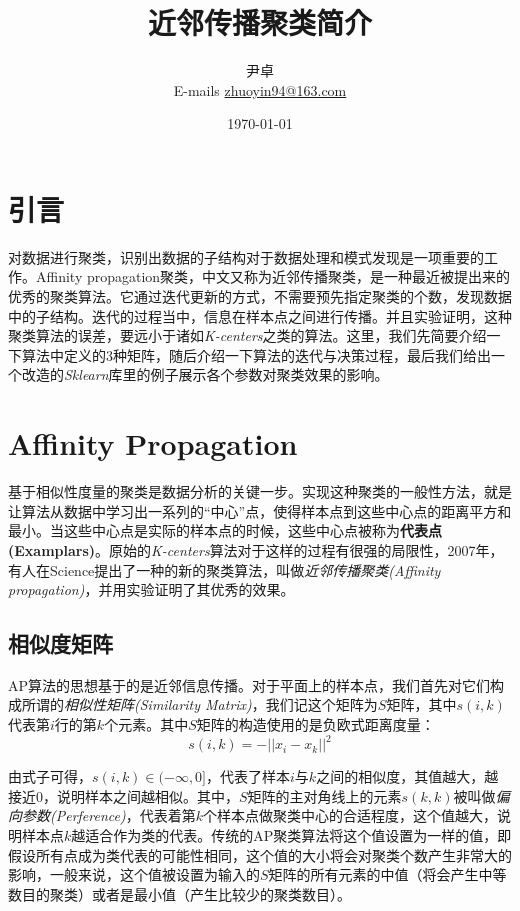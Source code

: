 \documentclass[UTF8, 12pt]{ctexart}
\begin{document}
	
	\title{\heiti \Huge{近邻传播聚类简介}}
	\author{\kaishu 尹卓 \\ E-mails \href{mailto:zhuoyin94@163.com}{zhuoyin94@163.com}}
	\date{\today}
	\maketitle
	
	\tableofcontents
	\newpage
	\section{引言}
	对数据进行聚类，识别出数据的子结构对于数据处理和模式发现是一项重要的工作。Affinity propagation聚类，中文又称为近邻传播聚类，是一种最近被提出来的优秀的聚类算法。它通过迭代更新的方式，不需要预先指定聚类的个数，发现数据中的子结构。迭代的过程当中，信息在样本点之间进行传播。并且实验证明，这种聚类算法的误差，要远小于诸如\emph{K-centers}之类的算法。这里，我们先简要介绍一下算法中定义的3种矩阵，随后介绍一下算法的迭代与决策过程，最后我们给出一个改造的\emph{Sklearn}库里的例子展示各个参数对聚类效果的影响。
	
	\section{Affinity Propagation}
	基于相似性度量的聚类是数据分析的关键一步。实现这种聚类的一般性方法，就是让算法从数据中学习出一系列的“中心”点，使得样本点到这些中心点的距离平方和最小。当这些中心点是实际的样本点的时候，这些中心点被称为\textbf{代表点(Examplars)}。原始的\emph{K-centers}算法对于这样的过程有很强的局限性，2007年，有人在Science提出了一种的新的聚类算法，叫做\emph{近邻传播聚类(Affinity propagation)}，并用实验证明了其优秀的效果\cite{frey2007clustering}。
	
	\subsection{相似度矩阵}
	AP算法的思想基于的是近邻信息传播\cite{唐丹2017改进的近邻传播聚类算法及其应用研究}。对于平面上的样本点，我们首先对它们构成所谓的\emph{相似性矩阵(Similarity Matrix)}，我们记这个矩阵为$S$矩阵，其中$s(i,k)$代表第$i$行的第$k$个元素。其中$S$矩阵的构造使用的是负欧式距离度量：
	\begin{equation}
	s(i,k) = -||x_{i}-x_{k}||^{2}
	\end{equation}
	
	由式子可得，$s(i,k)\in(-\infty,0]$，代表了样本$i$与$k$之间的相似度，其值越大，越接近0，说明样本之间越相似。其中，$S$矩阵的主对角线上的元素$s(k,k)$被叫做\emph{偏向参数(Perference)}，代表着第$k$个样本点做聚类中心的合适程度，这个值越大，说明样本点$k$越适合作为类的代表。传统的AP聚类算法将这个值设置为一样的值，即假设所有点成为类代表的可能性相同，这个值的大小将会对聚类个数产生非常大的影响，一般来说，这个值被设置为输入的$S$矩阵的所有元素的中值（将会产生中等数目的聚类）或者是最小值（产生比较少的聚类数目）\cite{frey2007clustering}。
	
\end{document}
